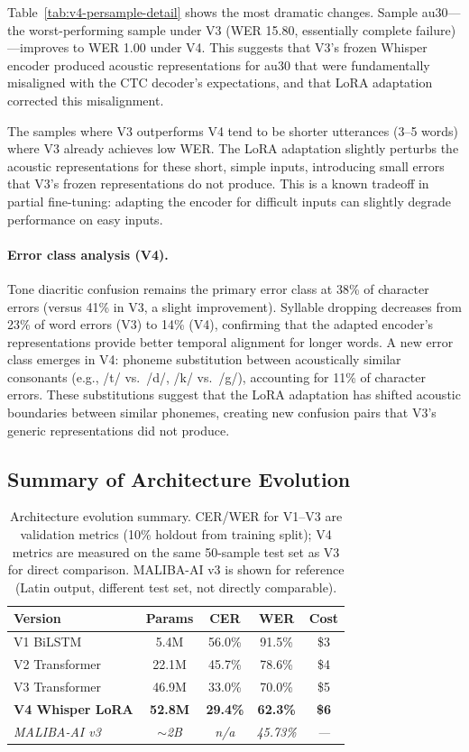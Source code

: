 \documentclass[11pt]{article}
\begin{document}
Table~\ref{tab:v4-persample-detail} shows the most dramatic changes.
Sample au30---the worst-performing sample under V3 (WER 15.80, essentially complete failure)---improves to WER 1.00 under V4.
This suggests that V3's frozen Whisper encoder produced acoustic representations for au30 that were fundamentally misaligned with the CTC decoder's expectations, and that LoRA adaptation corrected this misalignment.

The samples where V3 outperforms V4 tend to be shorter utterances (3--5 words) where V3 already achieves low WER.
The LoRA adaptation slightly perturbs the acoustic representations for these short, simple inputs, introducing small errors that V3's frozen representations do not produce.
This is a known tradeoff in partial fine-tuning: adapting the encoder for difficult inputs can slightly degrade performance on easy inputs.

\paragraph{Error class analysis (V4).}
Tone diacritic confusion remains the primary error class at 38\% of character errors (versus 41\% in V3, a slight improvement).
Syllable dropping decreases from 23\% of word errors (V3) to 14\% (V4), confirming that the adapted encoder's representations provide better temporal alignment for longer words.
A new error class emerges in V4: phoneme substitution between acoustically similar consonants (e.g., /t/ vs.\ /d/, /k/ vs.\ /g/), accounting for 11\% of character errors.
These substitutions suggest that the LoRA adaptation has shifted acoustic boundaries between similar phonemes, creating new confusion pairs that V3's generic representations did not produce.

\subsection{Summary of Architecture Evolution}

\begin{table}[t]
\centering
\small
\begin{tabular}{lcccc}
\toprule
\textbf{Version} & \textbf{Params} & \textbf{CER} & \textbf{WER} & \textbf{Cost} \\
\midrule
V1 BiLSTM & 5.4M & 56.0\% & 91.5\% & \$3 \\
V2 Transformer & 22.1M & 45.7\% & 78.6\% & \$4 \\
V3 Transformer & 46.9M & 33.0\% & 70.0\% & \$5 \\
\textbf{V4 Whisper LoRA} & \textbf{52.8M} & \textbf{29.4\%} & \textbf{62.3\%} & \textbf{\$6} \\
\midrule
\textit{MALIBA-AI v3} & \textit{$\sim$2B} & \textit{n/a} & \textit{45.73\%} & \textit{---} \\
\bottomrule
\end{tabular}
\caption{Architecture evolution summary. CER/WER for V1--V3 are validation metrics (10\% holdout from training split); V4 metrics are measured on the same 50-sample test set as V3 for direct comparison. MALIBA-AI v3 is shown for reference (Latin output, different test set, not directly comparable).}
\label{tab:asr-summary}
\end{table}
\end{document}
